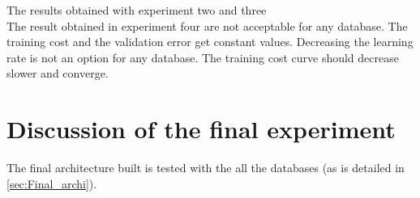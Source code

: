 The results obtained with experiment two and three\\

The result obtained in experiment four are not acceptable for any database. The training cost and the validation error get constant values. Decreasing the learning rate is not an option for any database. The training cost curve should decrease slower and converge.\\

\section{Discussion of the final experiment}
The final architecture built is tested with the all the databases (as is detailed in \ref{sec:Final_archi}).\\